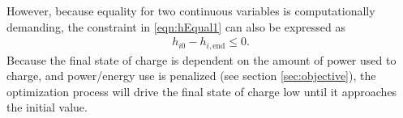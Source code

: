 However, because equality for two continuous variables is computationally demanding, the constraint in \eqref{eqn:hEqual1} can also be expressed as 
\begin{equation} \begin{aligned}
	h_{i0} - h_{i,\text{end}} \le 0.
\end{aligned} \end{equation}
Because the final state of charge is dependent on the amount of power used to charge, and power/energy use is penalized (see section \ref{sec:objective}), the optimization process will drive the final state of charge low until it approaches the initial value.
